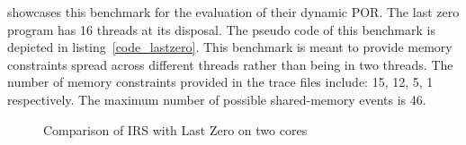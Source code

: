 \citet{abdulla2014optimal} showcases this benchmark for the evaluation of their dynamic POR. 
The last zero program has 16 threads at its disposal. 
The pseudo code of this benchmark is depicted in listing~\ref{code_lastzero}. 
This benchmark is meant to provide memory constraints spread across different threads rather than being in two threads. 
The number of memory constraints provided in the trace files include: 15, 12, 5, 1 respectively. 
The maximum number of possible shared-memory events is 46.

\begin{figure}[h]
     \centering
     \caption{Comparison of IRS with Last Zero on two cores}
\end{figure}


